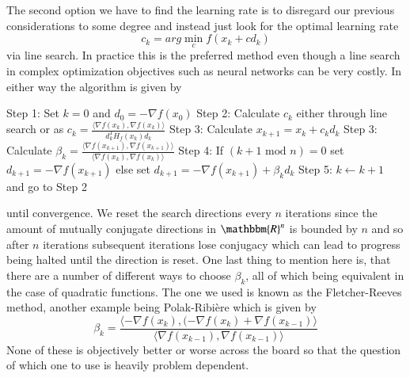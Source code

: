 \documentclass[preprint,12pt,3p]{elsarticle}
\begin{document}
The second option we have to find the learning rate is to disregard our previous considerations to some degree and instead just look for the optimal learning rate 
$$c_k=arg\min_c{f(x_k+cd_k)}$$
via line search. In practice this is the preferred method even though a line search in complex optimization objectives such as neural networks can be very costly. In either way the algorithm is given by
\vspace{0.4cm}
\begin{algorithmic}
\State Step 1: Set $k=0$ and $d_0=-\nabla f(x_0)$
\vspace{0.3cm}
\State Step 2: Calculate $c_k$ either through line search or as $c_k=\frac{\langle \nabla f(x_k), \nabla f(x_k)\rangle}{d_k^TH_f(x_k)d_k}$
\vspace{0.3cm}
\State Step 3: Calculate $x_{k+1}=x_k+c_kd_k$
\vspace{0.3cm}
\State Step 3: Calculate $\beta_k=\frac{\langle \nabla f(x_{k+1}),\nabla f(x_{k+1})\rangle}{\langle \nabla f(x_{k}),\nabla f(x_{k})\rangle}$
\vspace{0.3cm}
\State Step 4: If $(k+1 \mbox{ mod } n)=0$ set $d_{k+1}=-\nabla f(x_{k+1})$ else set $d_{k+1}=-\nabla f(x_{k+1})+\beta_{k}d_{k}$ 
\vspace{0.3cm}
\State Step 5: $k\gets k+1$ and go to Step 2
\vspace{0.3cm}
\end{algorithmic}
\vspace{0.4cm}
until convergence. We reset the search directions every $n$ iterations since the amount of mutually conjugate directions in $\mathbbm{R}^n$ is bounded by $n$ and so after $n$ iterations subsequent iterations lose conjugacy which can lead to progress being halted until the direction is reset. One last thing to mention here is, that there are a number of different ways to choose $\beta_k$, all of which being equivalent in the case of quadratic functions. The one we used is known as the Fletcher-Reeves method, another example being Polak-Ribière which is given by
$$\beta_k=\frac{\langle-\nabla f(x_k),(-\nabla f(x_k)+\nabla f(x_{k-1})\rangle}{\langle \nabla f(x_{k-1}),\nabla f(x_{k-1})\rangle}$$
None of these is objectively better or worse across the board so that the question of which one to use is heavily problem dependent.
\end{document}
